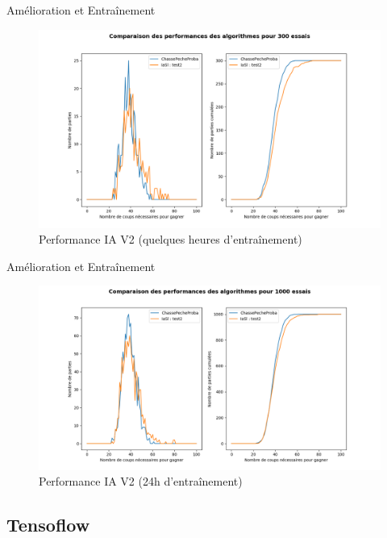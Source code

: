 	\begin{frame}{Amélioration et Entraînement}
	    \begin{figure}
	        \centering
	        \includegraphics[width=.95\linewidth]{images/perfiasl3.png}
	        \caption*{Performance IA V2 (quelques heures d'entraînement)}
	        \label{fig:perfiasl3}
	    \end{figure}{}
	\end{frame}{}
	
	\begin{frame}{Amélioration et Entraînement}
	    \begin{figure}
	        \centering
	        \includegraphics[width=.95\linewidth]{images/perfiasl4.png}
	        \caption*{Performance IA V2 (24h d'entraînement)}
	        \label{fig:perfiasl4}
	    \end{figure}{}
	\end{frame}{}

\subsection{Tensoflow}
	

